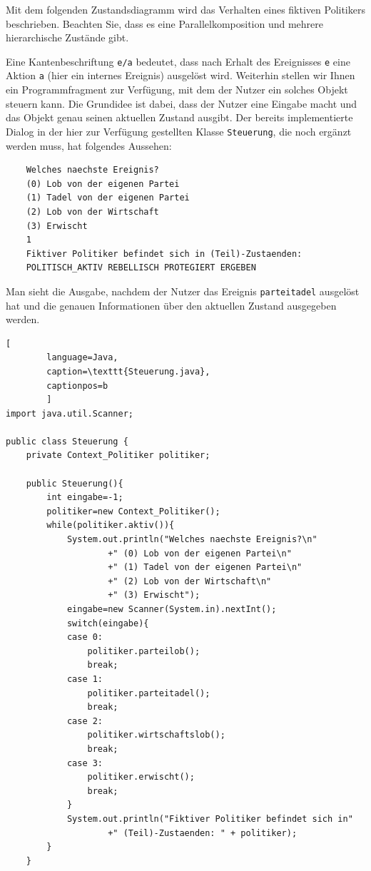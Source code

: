 \documentclass{abgabe}
\begin{document}
\begin{questions}

    Mit dem folgenden Zustandsdiagramm wird das Verhalten eines fiktiven Politikers beschrieben.
    Beachten Sie, dass es eine Parallelkomposition und mehrere hierarchische Zustände gibt.

    Eine Kantenbeschriftung \texttt{e/a} bedeutet, dass nach Erhalt des Ereignisses \texttt{e} eine Aktion \texttt{a} (hier ein internes Ereignis) ausgelöst wird.
    Weiterhin stellen wir Ihnen ein Programmfragment zur Verfügung, mit dem der Nutzer ein solches Objekt steuern kann.
    Die Grundidee ist dabei, dass der Nutzer eine Eingabe macht und das Objekt genau seinen aktuellen Zustand ausgibt.
    Der bereits implementierte Dialog in der hier zur Verfügung gestellten Klasse \texttt{Steuerung}, die noch ergänzt werden muss, hat folgendes Aussehen:

    \begin{lstlisting}
    Welches naechste Ereignis?
    (0) Lob von der eigenen Partei
    (1) Tadel von der eigenen Partei
    (2) Lob von der Wirtschaft
    (3) Erwischt
    1
    Fiktiver Politiker befindet sich in (Teil)-Zustaenden:
    POLITISCH_AKTIV REBELLISCH PROTEGIERT ERGEBEN
    \end{lstlisting}

    Man sieht die Ausgabe, nachdem der Nutzer das Ereignis \texttt{parteitadel} ausgelöst hat und die genauen Informationen über den aktuellen Zustand ausgegeben werden.

    \newpage

    \begin{lstlisting}[
        language=Java, 
        caption=\texttt{Steuerung.java}, 
        captionpos=b
        ]
import java.util.Scanner;

public class Steuerung {
    private Context_Politiker politiker;	
    
    public Steuerung(){
        int eingabe=-1;
        politiker=new Context_Politiker();
        while(politiker.aktiv()){
            System.out.println("Welches naechste Ereignis?\n"
                    +" (0) Lob von der eigenen Partei\n"
                    +" (1) Tadel von der eigenen Partei\n"
                    +" (2) Lob von der Wirtschaft\n"
                    +" (3) Erwischt");
            eingabe=new Scanner(System.in).nextInt();
            switch(eingabe){
            case 0: 
                politiker.parteilob();
                break;
            case 1:
                politiker.parteitadel();
                break;
            case 2:
                politiker.wirtschaftslob();
                break;
            case 3:
                politiker.erwischt();
                break;
            }
            System.out.println("Fiktiver Politiker befindet sich in"
                    +" (Teil)-Zustaenden: " + politiker);
        }
    }
    

\end{lstlisting}
\end{questions}
\end{document}
